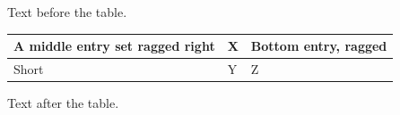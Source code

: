 \documentclass[12pt]{article}
\begin{document}
Text before the table.

\begin{tabular}{|>{\raggedright\arraybackslash}m{3cm}|l|>{\raggedright\arraybackslash}b{2.5cm}|}\hline A middle entry set ragged right & X & Bottom entry, ragged\\\hline Short & Y & Z\\\hline\end{tabular}

Text after the table.
\end{document}
